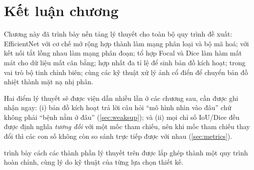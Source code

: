 \section{Kết luận chương}

Chương này đã trình bày nền tảng lý thuyết cho toàn bộ quy trình đề xuất:
EfficientNet với cơ chế mở rộng hợp thành làm mạng phân loại và bộ mã hoá;
\UNetpp{} với kết nối tắt lồng nhau làm mạng phân đoạn; tổ hợp Focal và Dice làm
hàm mất mát cho dữ liệu mất cân bằng; \GradCAMpp{} hợp nhất đa tỉ lệ để sinh bản
đồ kích hoạt; \SAM{} trong vai trò bộ tinh chỉnh biên; cùng các kỹ thuật xử lý ảnh
cổ điển để chuyển bản đồ nhiệt thành mặt nạ nhị phân.

Hai điểm lý thuyết sẽ được viện dẫn nhiều lần ở các chương sau, cần được ghi nhận
ngay: (i) bản đồ kích hoạt trả lời câu hỏi ``mô hình nhìn vào đâu'' chứ không phải
``bệnh nằm ở đâu'' (\cref{sec:weaksup}); và (ii) mọi chỉ số IoU/Dice đều được định
nghĩa \emph{tương đối} với một mốc tham chiếu, nên khi mốc tham chiếu thay đổi thì
các con số không còn so sánh trực tiếp được với nhau (\cref{sec:metrics}).

 trình bày cách các thành phần lý thuyết trên được lắp ghép
thành một quy trình hoàn chỉnh, cùng lý do kỹ thuật của từng lựa chọn thiết kế.
